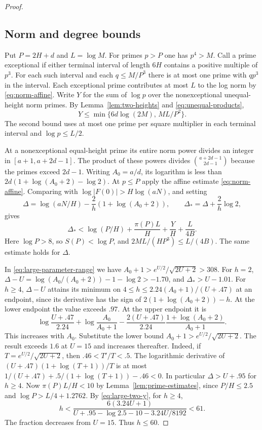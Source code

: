 \begin{proof}
\subsection*{Norm and degree bounds}

Put \(P=2H+d\) and \(L=\log M\). For primes \(p>P\) one
has \(p^4>M\). Call a prime exceptional if either terminal
interval of length \(6H\) contains a positive multiple of
\(p^3\). For each such interval and each \(q\le M/P^3\)
there is at most one prime with \(qp^3\) in the interval.
Each exceptional prime contributes at most \(L\) to the log
norm by \eqref{eq:norm-affine}. Write \(Y\) for the sum of
\(\log p\) over the nonexceptional unequal-height norm primes.
By Lemma~\ref{lem:two-heights} and \eqref{eq:unequal-products},
\begin{equation}\label{eq:large-two-y}
 Y\le \min\{6d\log(2M),\,ML/P^2\}.
\end{equation}
The second bound uses at most one prime per square multiplier
in each terminal interval and \(\log p\le L/2\).

At a nonexceptional equal-height prime its entire norm
power divides an integer in \([a+1,a+2d-1]\).
The product of these powers divides \(\binom{a+2d-1}{2d-1}\)
because the primes exceed \(2d-1\).
Writing \(A_0=a/d\), its logarithm is less than
\(2d(1+\log(A_0+2)-\log2)\).
At \(p\le P\) apply the affine estimate
\eqref{eq:norm-affine}. Comparing with
\(\log|F(0)|>H\log(aN)\), and setting
\[
 \Delta=\log(aN/H)-\frac2h(1+\log(A_0+2)),
 \qquad \Delta_*=\Delta+\frac2h\log2 ,
\]
gives
\begin{equation}\label{eq:large-norm}
 \Delta_*<\log(P/H)+\frac{\pi(P)L}{H}+\frac{Y}{H}+\frac{L}{4B}.
\end{equation}
Here \(\log P>8\), so \(S(P)<\log P\), and
\(2ML/(HP^3)\le L/(4B)\). The same estimate holds for \(\Delta\).

In \eqref{eq:large-parameter-range} we have
\(A_0+1>e^{U/2}/\sqrt{2U+2}>308\).
For \(h=2\), \(\Delta-U=\log(A_0/(A_0+2))-1-\log2>-1.70\),
and \(\Delta_*>U-1.01\).
For \(h\ge4\), \(\Delta-U\) attains its minimum on
\(4\le h\le 2.24(A_0+1)/(U+.47)\) at an endpoint, since
its derivative has the sign of \(2(1+\log(A_0+2))-h\).
At the lower endpoint the value exceeds \(.97\).
At the upper endpoint it is
\[
 \log\frac{U+.47}{2.24}+\log\frac{A_0}{A_0+1}
 -\frac{2(U+.47)}{2.24}\frac{1+\log(A_0+2)}{A_0+1}.
\]
This increases with \(A_0\). Substitute the lower bound
\(A_0+1>e^{U/2}/\sqrt{2U+2}\). The result exceeds \(1.6\)
at \(U=15\) and increases thereafter. Indeed, if
\(T=e^{U/2}/\sqrt{2U+2}\), then \(.46<T'/T<.5\).
The logarithmic derivative of
\((U+.47)(1+\log(T+1))/T\) is at most
\(1/(U+.47)+.5/(1+\log(T+1))-.46<0\).
In particular \(\Delta>U+.95\) for \(h\ge4\).
Now \(\pi(P)L/H<10\) by Lemma~\ref{lem:prime-estimates},
since \(P/H\le2.5\) and \(\log P>L/4+1.2762\).
By \eqref{eq:large-two-y}, for \(h\ge4\),
\[
 h<\frac{6(3.24U+1)}
           {U+.95-\log2.5-10-3.24U/8192}<61 .
\]
The fraction decreases from \(U=15\). Thus \(h\le60\).


\end{proof}
